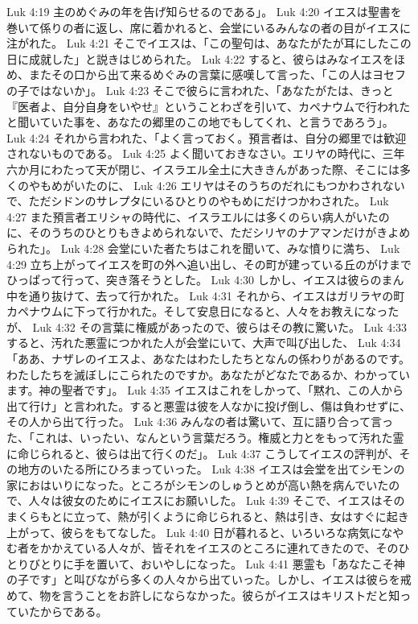 Luk 4:19  主のめぐみの年を告げ知らせるのである」。
Luk 4:20  イエスは聖書を巻いて係りの者に返し、席に着かれると、会堂にいるみんなの者の目がイエスに注がれた。
Luk 4:21  そこでイエスは、「この聖句は、あなたがたが耳にしたこの日に成就した」と説きはじめられた。
Luk 4:22  すると、彼らはみなイエスをほめ、またその口から出て来るめぐみの言葉に感嘆して言った、「この人はヨセフの子ではないか」。
Luk 4:23  そこで彼らに言われた、「あなたがたは、きっと『医者よ、自分自身をいやせ』ということわざを引いて、カペナウムで行われたと聞いていた事を、あなたの郷里のこの地でもしてくれ、と言うであろう」。
Luk 4:24  それから言われた、「よく言っておく。預言者は、自分の郷里では歓迎されないものである。
Luk 4:25  よく聞いておきなさい。エリヤの時代に、三年六か月にわたって天が閉じ、イスラエル全土に大ききんがあった際、そこには多くのやもめがいたのに、
Luk 4:26  エリヤはそのうちのだれにもつかわされないで、ただシドンのサレプタにいるひとりのやもめにだけつかわされた。
Luk 4:27  また預言者エリシャの時代に、イスラエルには多くのらい病人がいたのに、そのうちのひとりもきよめられないで、ただシリヤのナアマンだけがきよめられた」。
Luk 4:28  会堂にいた者たちはこれを聞いて、みな憤りに満ち、
Luk 4:29  立ち上がってイエスを町の外へ追い出し、その町が建っている丘のがけまでひっぱって行って、突き落そうとした。
Luk 4:30  しかし、イエスは彼らのまん中を通り抜けて、去って行かれた。
Luk 4:31  それから、イエスはガリラヤの町カペナウムに下って行かれた。そして安息日になると、人々をお教えになったが、
Luk 4:32  その言葉に権威があったので、彼らはその教に驚いた。
Luk 4:33  すると、汚れた悪霊につかれた人が会堂にいて、大声で叫び出した、
Luk 4:34  「ああ、ナザレのイエスよ、あなたはわたしたちとなんの係わりがあるのです。わたしたちを滅ぼしにこられたのですか。あなたがどなたであるか、わかっています。神の聖者です」。
Luk 4:35  イエスはこれをしかって、「黙れ、この人から出て行け」と言われた。すると悪霊は彼を人なかに投げ倒し、傷は負わせずに、その人から出て行った。
Luk 4:36  みんなの者は驚いて、互に語り合って言った、「これは、いったい、なんという言葉だろう。権威と力とをもって汚れた霊に命じられると、彼らは出て行くのだ」。
Luk 4:37  こうしてイエスの評判が、その地方のいたる所にひろまっていった。
Luk 4:38  イエスは会堂を出てシモンの家におはいりになった。ところがシモンのしゅうとめが高い熱を病んでいたので、人々は彼女のためにイエスにお願いした。
Luk 4:39  そこで、イエスはそのまくらもとに立って、熱が引くように命じられると、熱は引き、女はすぐに起き上がって、彼らをもてなした。
Luk 4:40  日が暮れると、いろいろな病気になやむ者をかかえている人々が、皆それをイエスのところに連れてきたので、そのひとりびとりに手を置いて、おいやしになった。
Luk 4:41  悪霊も「あなたこそ神の子です」と叫びながら多くの人々から出ていった。しかし、イエスは彼らを戒めて、物を言うことをお許しにならなかった。彼らがイエスはキリストだと知っていたからである。
